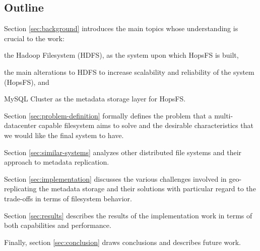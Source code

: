 \subsection{Outline}

Section \ref{sec:background} introduces the main topics whose understanding is crucial to the work:
\begin{inparaenum}[1)]
\item the Hadoop Filesystem (HDFS), as the system upon which HopsFS is built,
\item the main alterations to HDFS to increase scalability and reliability of the system (HopsFS), and
\item MySQL Cluster as the metadata storage layer for HopsFS.
\end{inparaenum}

Section \ref{sec:problem-definition} formally defines the problem that a multi-datacenter capable filesystem aims to solve and the desirable characteristics that we would like the final system to have.

Section \ref{sec:similar-systems} analyzes other distributed file systems and their approach to metadata replication.

Section \ref{sec:implementation} discusses the various challenges involved in geo-replicating the metadata storage and their solutions with particular regard to the trade-offs in terms of filesystem behavior.

Section \ref{sec:results} describes the results of the implementation work in terms of both capabilities and performance.

Finally, section \ref{sec:conclusion} draws conclusions and describes future work.
